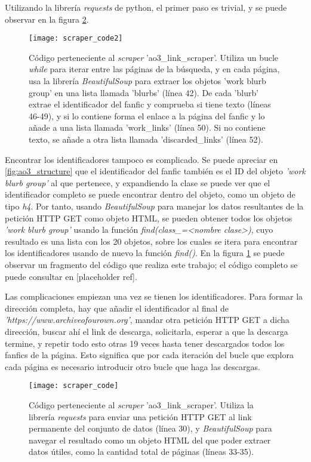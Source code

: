 \documentclass{pre-tfg}
\newcommand{\refToLinkScraperCode}{[placeholder ref]}
\begin{document}
Utilizando la librería \textit{requests} de python, el primer paso es trivial, y se puede observar en la figura \ref{code:scraper1}.

\begin{figure}
	\texttt{[image: scraper\_code2]}
	\caption{Código perteneciente al \textit{scraper} 'ao3\_link\_scraper'. Utiliza un bucle \textit{while} para iterar entre las páginas de la búsqueda, y en cada página, usa la librería \textit{BeautifulSoup} para extraer los objetos 'work blurb group' en una lista llamada 'blurbs' (línea 42). De cada 'blurb' extrae el identificador del fanfic y comprueba si tiene texto (líneas 46-49), y si lo contiene forma el enlace a la página del fanfic y lo añade a una lista llamada 'work\_links' (línea 50). Si no contiene texto, se añade a otra lista llamada 'discarded\_links' (línea 52).}
	\label{code:scraper2}
\end{figure}

Encontrar los identificadores tampoco es complicado. Se puede apreciar en \ref{fig:ao3_structure} que el identificador del fanfic también es el ID del objeto \textit{'work blurb group'} al que pertenece, y expandiendo la clase se puede ver que el identificador completo se puede encontrar dentro del objeto, como un objeto de tipo \textit{h4}. Por tanto, usando \textit{BeautifulSoup} para manejar los datos resultantes de la petición HTTP GET como objeto HTML, se pueden obtener todos los objetos \textit{'work blurb group'} usando la función \textit{find(class\_=<nombre clase>)}, cuyo resultado es una lista con los 20 objetos, sobre los cuales se itera para encontrar los identificadores usando de nuevo la función \textit{find()}. En la figura \ref{code:scraper2} se puede observar un fragmento del código que realiza este trabajo; el código completo se puede consultar en \refToLinkScraperCode.

Las complicaciones empiezan una vez se tienen los identificadores. Para formar la dirección completa, hay que añadir el identificador al final de \textit{'https://www.archiveofourown.org'}, mandar otra petición HTTP GET a dicha dirección, buscar ahí el link de descarga, solicitarla, esperar a que la descarga termine, y repetir todo esto otras 19 veces hasta tener descargados todos los fanfics de la página. Esto significa que por cada iteración del bucle que explora cada página es necesario introducir otro bucle que haga las descargas.

\begin{figure}
	\texttt{[image: scraper\_code]}
	\caption{Código perteneciente al \textit{scraper} 'ao3\_link\_scraper'. Utiliza la librería \textit{requests} para enviar una petición HTTP GET al link permanente del conjunto de datos (línea 30), y \textit{BeautifulSoup} para navegar el resultado como un objeto HTML del que poder extraer datos útiles, como la cantidad total de páginas (líneas 33-35).}
	\label{code:scraper1}
	\centering
\end{figure}
\end{document}
